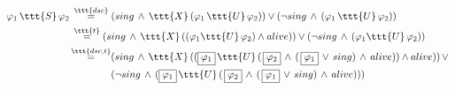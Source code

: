 \documentclass[11pt]{article}
\begin{document}
    $\begin{aligned}
         \varphi_1\,\ttt{S}\,\varphi_2 \,&\overset{\ttt{dsc}}{=} (sing\,\land\,\ttt{X}\,(\varphi_1\,\ttt{U}\,\varphi_2)) \lor (\neg sing\,\land\,(\varphi_1\,\ttt{U}\,\varphi_2))\\
         &\overset{\ttt{t}}{=} (sing\,\land\,\ttt{X}\,((\varphi_1\ttt{U}\,\varphi_2) \land alive)) \lor (\neg sing\,\land\,(\varphi_1\ttt{U}\,\varphi_2))\\
         &\begin{aligned}\overset{\ttt{dsc,t}}{=}&(sing\,\land\,\ttt{X}\,((\boxed{\varphi_1}\,\ttt{U}\,(\,\boxed{\varphi_2}\,\land\,(\,\boxed{\varphi_1}\,\lor\,sing)\,\land\,alive)) \land alive))\,\lor\, \\
         &(\neg sing\,\land\,(\boxed{\varphi_1}\,\ttt{U}\,(\,\boxed{\varphi_2}\,\land\,(\,\boxed{\varphi_1}\,\lor\,sing)\,\land\,alive)))\end{aligned}
    \end{aligned}$
\end{document}
